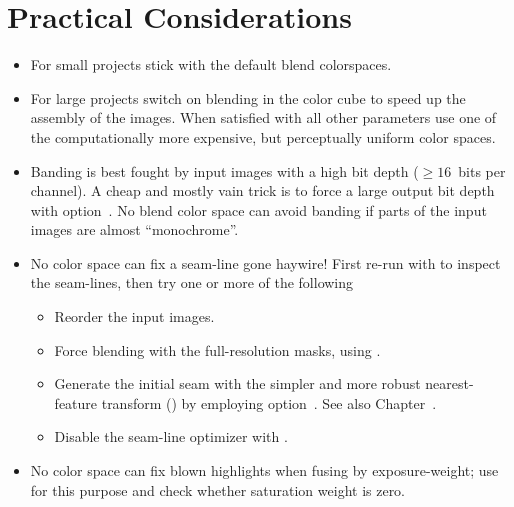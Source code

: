\section[Practical Considerations]{Practical Considerations
  \label{sec:practical-considerations}
  }

\begin{itemize}
\item
  For small projects stick with the default blend colorspaces.

\item
  For large projects switch on blending in the  color cube
  to speed up the assembly of the images.  When satisfied with all other
  parameters use one of the computationally more expensive, but
  perceptually uniform color spaces.

\item
  Banding is best fought by input images with a high bit depth
  (\mbox{$\geq 16$ bits} per channel).  A cheap and mostly vain trick
  is to force a large output bit depth with
  option~.  No blend color
  space can avoid banding if parts of the input images are almost
  ``monochrome''.

\ifenblend
  \item
     No color space can
    fix a seam-line gone haywire!  First re-run 
    with  to inspect
    the seam-lines, then try one or more of the following
    \begin{itemize}
    \item
      Reorder the input images.

    \item
      Force blending with the full-resolution masks, using
      .

    \item
      Generate the initial seam with the simpler and more robust
      nearest-feature transform () by employing
      option~.  See also
      Chapter~.

    \item
      Disable the seam-line optimizer with .
    \end{itemize}
\fi

\ifenfuse
  \item
     No color space can fix
    blown highlights when fusing by exposure-weight; use
     for
    this purpose and check whether saturation weight is zero.
\fi
\end{itemize}

